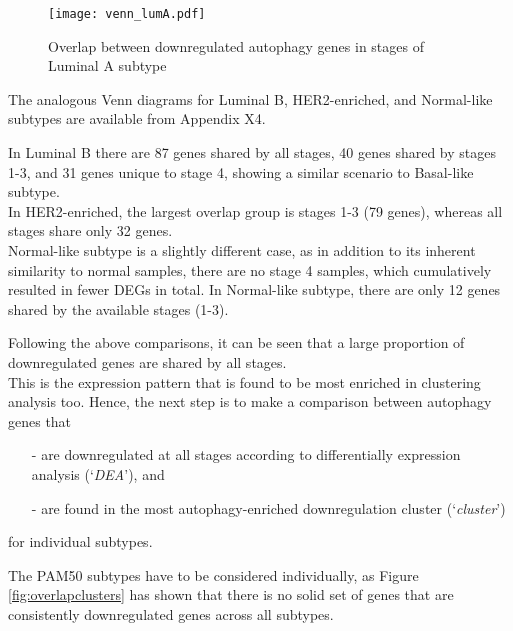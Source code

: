 \begin{wrapfigure}{L}{0.46\textwidth}
        \hfill
        \captionsetup{justification=centering}
        \centerline{ \texttt{[image: venn\_lumA.pdf]}}
        
        \vspace*{-4mm}
        \caption[Overlap between downregulated autophagy genes in stages of Luminal A subtype]{\label{fig:vennluma}Overlap between downregulated autophagy genes in stages of Luminal A subtype}
        \end{wrapfigure}
       

The analogous Venn diagrams for Luminal B, HER2-enriched, and Normal-like subtypes are available from Appendix X4.

In Luminal B there are 87 genes shared by all stages, 40 genes shared by stages 1-3, and 31 genes unique to stage 4, showing a similar scenario to Basal-like subtype.\\In HER2-enriched, the largest overlap group is stages 1-3 (79 genes), whereas all stages share only 32 genes.\\Normal-like subtype is a slightly different case, as in addition to its inherent similarity to normal samples, there are no stage 4 samples, which cumulatively resulted in fewer DEGs in total. In Normal-like subtype, there are only 12 genes shared by the available stages (1-3). \\
\newline

\newpage
Following the above comparisons, it can be seen that a large proportion of downregulated genes are shared by all stages.\\ This is the expression pattern that is found to be most enriched in clustering analysis too. Hence, the next step is to make a comparison between autophagy genes that  \begin{itemize}
     \item[-] are downregulated at all stages according to differentially expression analysis (‘\textit{DEA}’),  and 
     \item[-] are found in the most autophagy-enriched downregulation cluster  (‘\textit{cluster}’)
\end{itemize}
for individual subtypes. 

The PAM50 subtypes have to be considered individually, as Figure \ref{fig:overlapclusters} has shown that there is no solid set of genes that are consistently downregulated genes across all subtypes.\\

